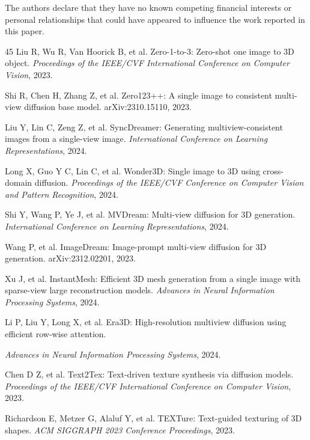 \documentclass[times,twocolumn,final]{elsarticle}
\providecommand{\DIFadd}[1]{{\protect\color{blue} \sf #1}} %
\providecommand{\DIFaddbegin}{} %
\providecommand{\DIFaddend}{} %
\newcommand{\DIFaddincludegraphics}[2][]{{\color{blue}\fbox{\DIFOincludegraphics[#1]{#2}}}} %
\DeclareRobustCommand{\DIFaddbegin}{\DIFOaddbegin \let\includegraphics\DIFaddincludegraphics} %
\DeclareRobustCommand{\DIFaddend}{\DIFOaddend \let\includegraphics\DIFOincludegraphics} %
\begin{document}
\DIFadd{The authors declare that they have no known competing financial interests or personal relationships that could have appeared to influence the work reported in this paper.
}


\begin{thebibliography}{45}
\DIFaddend {}
Liu R, Wu R, Van Hoorick B, et al. Zero-1-to-3: Zero-shot one image to 3D object. \textit{Proceedings of the IEEE/CVF International Conference on Computer Vision}, 2023.

Shi R, Chen H, Zhang Z, et al. Zero123++: A single image to consistent multi-view diffusion base model. arXiv:2310.15110, 2023.

Liu Y, Lin C, Zeng Z, et al. SyncDreamer: Generating multiview-consistent images from a single-view image.   \DIFaddbegin \DIFadd{\textit{International Conference on Learning Representations}, 2024.
}\DIFaddend

Long X, Guo Y C, Lin C, et al. Wonder3D: Single image to 3D using cross-domain diffusion.   \DIFaddbegin \DIFadd{\textit{Proceedings of the IEEE/CVF Conference on Computer Vision and Pattern Recognition}, 2024.
}\DIFaddend

Shi Y, Wang P, Ye J, et al. MVDream: Multi-view diffusion for 3D generation. \textit{International Conference on Learning Representations}, 2024.

Wang P, et al. ImageDream: Image-prompt multi-view diffusion for 3D generation. arXiv:2312.02201, 2023.

Xu J, et al. InstantMesh: Efficient 3D mesh generation from a single image with sparse-view large reconstruction models. \textit{Advances in Neural Information Processing Systems}, 2024.

  \DIFaddbegin \DIFadd{Li P, Liu Y, Long X}\DIFaddend , et al. Era3D: High-resolution multiview diffusion using efficient row-wise attention.  

 \DIFaddbegin \DIFadd{\textit{Advances in Neural Information Processing Systems}}\DIFaddend , 2024.

Chen D Z, et al. Text2Tex: Text-driven texture synthesis via diffusion models.   \DIFaddbegin \DIFadd{\textit{Proceedings of the IEEE/CVF International Conference on Computer Vision}}\DIFaddend , 2023.

Richardson E, \DIFaddbegin \DIFadd{Metzer G, Alaluf Y, }\DIFaddend et al. TEXTure:   \DIFaddbegin \DIFadd{Text-guided texturing of 3D shapes. \textit{ACM SIGGRAPH 2023 Conference Proceedings}}\DIFaddend , 2023.


\end{thebibliography}
\end{document}
